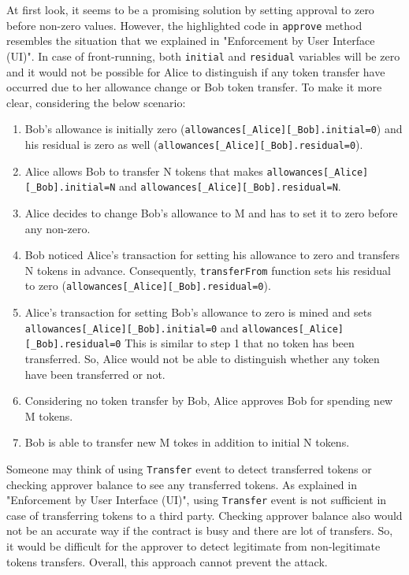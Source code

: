 \noindent At first look, it seems to be a promising solution by setting approval to zero before non-zero values. However, the highlighted code in \texttt{approve} method resembles the situation that we explained in "Enforcement by User Interface (UI)". In case of front-running, both \texttt{initial} and \texttt{residual} variables will be zero and it would not be possible for Alice to distinguish if any token transfer have occurred due to her allowance change or Bob token transfer. To make it more clear, considering the below scenario:  
\begin{enumerate}
	\item Bob’s allowance is initially zero (\texttt{allowances[\_Alice][\_Bob].initial=0}) and his residual is zero as well (\texttt{allowances[\_Alice][\_Bob].residual=0}).
	\item Alice allows Bob to transfer N tokens that makes \texttt{allowances[\_Alice][\_Bob].initial=N} and \texttt{allowances[\_Alice][\_Bob].residual=N}.
	\item Alice decides to change Bob’s allowance to M and has to set it to zero before any non-zero.
	\item Bob noticed Alice’s transaction for setting his allowance to zero and transfers N tokens in advance. Consequently, \texttt{transferFrom} function sets his residual to zero (\texttt{allowances[\_Alice][\_Bob].residual=0}).
	\item Alice’s transaction for setting Bob's allowance to zero is mined and sets \texttt{allowances[\_Alice][\_Bob].initial=0} and \texttt{allowances[\_Alice][\_Bob].residual=0} This is similar to step 1 that no token has been transferred. So, Alice would not be able to distinguish whether any token have been transferred or not.
	\item Considering no token transfer by Bob, Alice approves Bob for spending new M tokens.
	\item Bob is able to transfer new M tokes in addition to initial N tokens.\newline
\end{enumerate}
Someone may think of using \texttt{Transfer} event to detect transferred tokens or checking approver balance to see any transferred tokens. As explained in "Enforcement by User Interface (UI)", using \texttt{Transfer} event is not sufficient in case of transferring tokens to a third party. Checking approver balance also would not be an accurate way if the contract is busy and there are lot of transfers. So, it would be difficult for the approver to detect legitimate from non-legitimate tokens transfers. Overall, this approach cannot prevent the attack.

